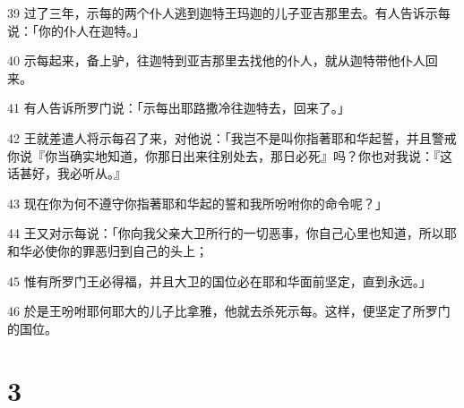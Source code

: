 \par 39 过了三年，示每的两个仆人逃到迦特王玛迦的儿子亚吉那里去。有人告诉示每说：「你的仆人在迦特。」
\par 40 示每起来，备上驴，往迦特到亚吉那里去找他的仆人，就从迦特带他仆人回来。
\par 41 有人告诉所罗门说：「示每出耶路撒冷往迦特去，回来了。」
\par 42 王就差遣人将示每召了来，对他说：「我岂不是叫你指著耶和华起誓，并且警戒你说『你当确实地知道，你那日出来往别处去，那日必死』吗？你也对我说：『这话甚好，我必听从。』
\par 43 现在你为何不遵守你指著耶和华起的誓和我所吩咐你的命令呢？」
\par 44 王又对示每说：「你向我父亲大卫所行的一切恶事，你自己心里也知道，所以耶和华必使你的罪恶归到自己的头上；
\par 45 惟有所罗门王必得福，并且大卫的国位必在耶和华面前坚定，直到永远。」
\par 46 於是王吩咐耶何耶大的儿子比拿雅，他就去杀死示每。这样，便坚定了所罗门的国位。

\chapter{3}

